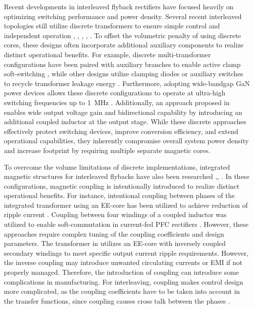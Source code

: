 \documentclass[lettersize,journal]{IEEEtran}
\begin{document}
Recent developments in interleaved flyback rectifiers have focused heavily on optimizing switching performance and power density. Several recent interleaved topologies still utilize discrete transformers to ensure simple control and independent operation \cite{shi2024}, \cite{cheng2018}, \cite{wu2015}, \cite{cheng2023}, \cite{mayer2025}. To offset the volumetric penalty of using discrete cores, these designs often incorporate additional auxiliary components to realize distinct operational benefits. For example, discrete multi-transformer configurations have been paired with auxiliary branches to enable active clamp soft-switching \cite{shi2024}, while other designs utilize clamping diodes or auxiliary switches to recycle transformer leakage energy \cite{cheng2018, wu2015}. Furthermore, adopting wide-bandgap GaN power devices allows these discrete configurations to operate at ultra-high switching frequencies up to 1~MHz \cite{cheng2023}. Additionally, an approach proposed in \cite{mayer2025} enables wide output voltage gain and bidirectional capability by introducing an additional coupled inductor at the output stage. While these discrete approaches effectively protect switching devices, improve conversion efficiency, and extend operational capabilities, they inherently compromise overall system power density and increase footprint by requiring multiple separate magnetic cores.

To overcome the volume limitations of discrete implementations, integrated magnetic structures for interleaved flybacks have also been researched \cite{ishihara2015},\cite{tonolo2025}, \cite{qian2008}. In these configurations, magnetic coupling is intentionally introduced to realize distinct operational benefits. For instance, intentional coupling between phases of the integrated transformer using an EE-core has been utilized to achieve reduction of ripple current \cite{ishihara2015}. Coupling between four windings of a coupled inductor was utilized to enable soft-commutation in current-fed PFC rectifiers \cite{tonolo2025}. However, these approaches require complex tuning of the coupling coefficients and design parameters. The transformer in \cite{qian2008} utilizes an EE-core with inversely coupled secondary windings to meet specific output current ripple requirements. However, the inverse coupling may introduce unwanted circulating currents or EMI if not properly managed. Therefore, the introduction of coupling can introduce some complications in manufacturing. For interleaving, coupling makes control design more complicated, as the coupling coefficients have to be taken into account in the transfer functions, since coupling causes cross talk between the phases \cite{Mao_2011}. 
\end{document}
